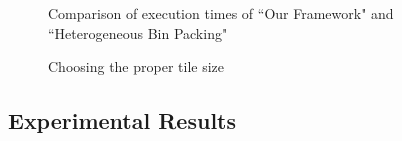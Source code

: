 \begin{figure}[t!]
{    \label{fig:jacl1ho}
  }
  \caption{Comparison of execution times of ``Our Framework" and
    ``Heterogeneous Bin Packing"}
  \label{fig:ho}
\end{figure}

\begin{figure}[t!]
  \centering
  \caption{Choosing the proper tile size}
  \label{fig:comm}
\end{figure}

\subsection{Experimental Results}
\label{sec:results-1}

